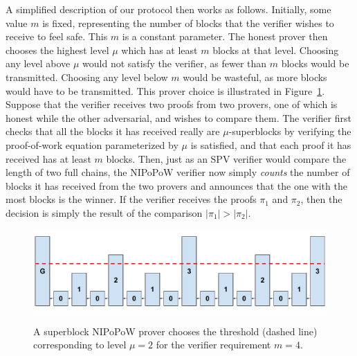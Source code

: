 A simplified description of our protocol then works as follows. Initially, some value
$m$ is fixed, representing the number of blocks that the verifier wishes to
receive to feel safe. This $m$ is a constant parameter. The honest prover then
chooses the highest level $\mu$ which has at least $m$ blocks at that level.
Choosing any level above $\mu$ would not satisfy the verifier, as fewer than $m$
blocks would be transmitted. Choosing any level below $m$ would be wasteful, as
more blocks would have to be transmitted. This prover choice is illustrated in
Figure~\ref{fig.level-threshold}. Suppose that the verifier receives two
proofs from two provers, one of which is honest while the other adversarial, and
wishes to compare them. The verifier first checks that all the blocks it has
received really are $\mu$-superblocks by verifying the proof-of-work equation
parameterized by $\mu$ is satisfied, and that each proof it has received has at
least $m$ blocks. Then, just as an SPV verifier would compare the length of two
full chains, the NIPoPoW verifier now simply \emph{counts} the number of blocks
it has received from the two provers and announces that the one with the most
blocks is the winner. If the verifier receives the proofs $\pi_1$ and $\pi_2$,
then the decision is simply the result of the comparison $|\pi_1| > |\pi_2|$.

\begin{figure}[ht]
    \caption{A superblock NIPoPoW prover chooses the threshold (dashed line)
    corresponding to level $\mu = 2$ for the verifier requirement $m = 4$.}
    \centering
    \includegraphics[width=0.7\columnwidth,keepaspectratio]{chapters/introduction/figures/level-threshold.pdf}
    \label{fig.level-threshold}
\end{figure}


